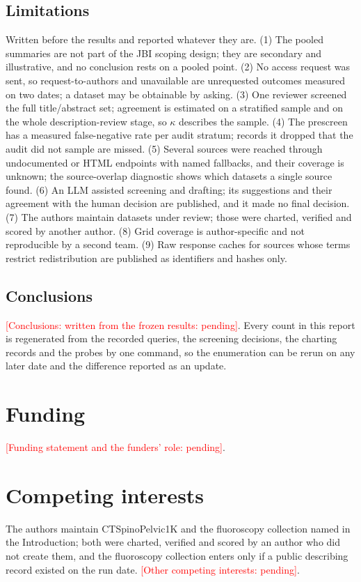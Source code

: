 \documentclass[11pt,a4paper]{article}
\newcommand{\pending}[1]{\textcolor{red}{[#1: pending]}}
\begin{document}
\subsection{Limitations}\label{sec:limitations}
Written before the results and reported whatever they are. (1) The pooled summaries are not part of the JBI scoping design; they are secondary and illustrative, and no conclusion rests on a pooled point. (2) No access request was sent, so request-to-authors and unavailable are unrequested outcomes measured on two dates; a dataset may be obtainable by asking. (3) One reviewer screened the full title/abstract set; agreement is estimated on a stratified sample and on the whole description-review stage, so $\kappa$ describes the sample. (4) The prescreen has a measured false-negative rate per audit stratum; records it dropped that the audit did not sample are missed. (5) Several sources were reached through undocumented or HTML endpoints with named fallbacks, and their coverage is unknown; the source-overlap diagnostic shows which datasets a single source found. (6) An LLM assisted screening and drafting; its suggestions and their agreement with the human decision are published, and it made no final decision. (7) The authors maintain datasets under review; those were charted, verified and scored by another author. (8) Grid coverage is author-specific and not reproducible by a second team. (9) Raw response caches for sources whose terms restrict redistribution are published as identifiers and hashes only.

\subsection{Conclusions}\label{sec:conclusions}
\pending{Conclusions: written from the frozen results}. Every count in this report is regenerated from the recorded queries, the screening decisions, the charting records and the probes by one command, so the enumeration can be rerun on any later date and the difference reported as an update.

\section*{Funding}\label{sec:funding}
\pending{Funding statement and the funders' role}.

\section*{Competing interests}\label{sec:competing}
The authors maintain CTSpinoPelvic1K and the fluoroscopy collection named in the Introduction; both were charted, verified and scored by an author who did not create them, and the fluoroscopy collection enters only if a public describing record existed on the run date. \pending{Other competing interests}.
\end{document}
